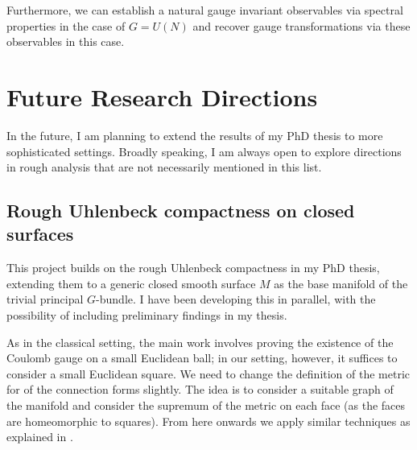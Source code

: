 \documentclass[12pt]{article}
\numberwithin{equation}{section}
\theoremstyle{definition}
\theoremstyle{remark}
\newcommand{\1}{\mathbf 1}
\newcommand{\<}{\langle}
\renewcommand{\>}{\rangle}
\begin{document}
Furthermore, we can establish a natural gauge invariant observables via spectral properties  in the case of $G=U(N)$ and recover gauge transformations via these observables in this case.  



\section{Future Research Directions}\label{sec:future}
In the future, I am planning to extend the results of my PhD thesis to more sophisticated settings. Broadly speaking, I am always open to explore directions in rough analysis that are not necessarily mentioned in this list. 



\subsection{Rough Uhlenbeck compactness on closed surfaces}
%
This project builds on the rough Uhlenbeck compactness in my PhD thesis, extending them to a generic closed smooth surface $M$ as the base manifold of the trivial principal $G$-bundle. I have been developing this in parallel, with the possibility of including preliminary findings in my thesis.
%
%

As in the classical setting, the main work involves proving the existence of the Coulomb gauge on a small Euclidean ball; in our setting, however, it suffices to consider a small Euclidean square. We need to change the definition of the metric for of the connection forms slightly. The idea is to consider a suitable graph of the manifold and consider the supremum of the metric on each face (as the faces are homeomorphic to squares). From here onwards we apply similar techniques as explained in . 


\end{document}
